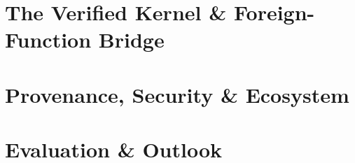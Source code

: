 \documentclass[11pt,letterpaper,twoside,openright]{report}
\begin{document}
\part{The Verified Kernel \& Foreign-Function Bridge}
\label{part:kernel}




\part{Provenance, Security \& Ecosystem}
\label{part:eco}






\part{Evaluation \& Outlook}
\label{part:eval}









\appendix





\end{document}
